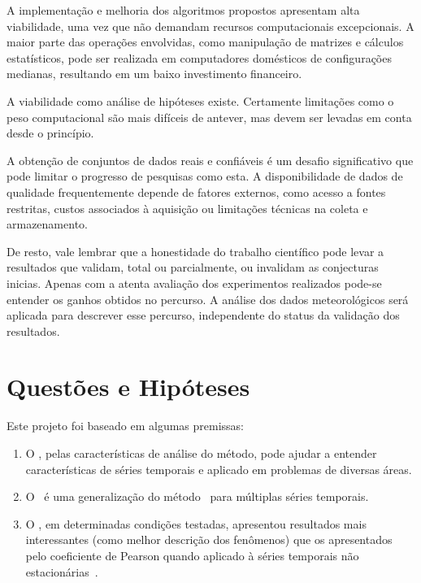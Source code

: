 A implementação e melhoria dos algoritmos propostos apresentam alta viabilidade, uma vez que não demandam recursos computacionais excepcionais. A maior parte das operações envolvidas, como manipulação de matrizes e cálculos estatísticos, pode ser realizada em computadores domésticos de configurações medianas, resultando em um baixo investimento financeiro.

A viabilidade como análise de hipóteses existe. Certamente limitações como o peso computacional são mais difíceis de antever, mas devem ser levadas em
conta desde o princípio.

A obtenção de conjuntos de dados reais e confiáveis é um desafio significativo que pode limitar o progresso de pesquisas como esta. A disponibilidade de dados de qualidade frequentemente depende de fatores externos, como acesso a fontes restritas, custos associados à aquisição ou limitações técnicas na coleta e armazenamento.

De resto, vale lembrar que a honestidade do trabalho científico pode levar a resultados que validam, total ou parcialmente, ou invalidam as conjecturas inicias. Apenas com a atenta avaliação dos experimentos realizados pode-se entender os ganhos obtidos no percurso. A análise dos dados meteorológicos será aplicada para descrever esse percurso, independente do status da validação dos resultados.


\section{Questões e Hipóteses}
\label{sec:questoes}

Este projeto foi baseado em algumas premissas:

\begin{enumerate}
    \label{enum:premissas}

    \item O \dmc, pelas características de análise do método, pode ajudar a entender características de séries temporais e aplicado em problemas de diversas áreas.
    \item O \dmc~é uma generalização do método \pdcca~para múltiplas séries temporais.
	\item O \pdcca, em determinadas condições testadas, apresentou resultados mais interessantes (como melhor descrição dos fenômenos) que os apresentados pelo coeficiente de Pearson quando aplicado à séries temporais não estacionárias~\cite{Wang2013}. 
\end{enumerate}

